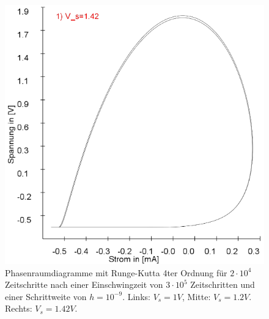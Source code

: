 \documentclass[11,5pt, twoside]{article}
\begin{document}
\begin{figure}[!htbp]
\includegraphics[scale=0.26]{schwing-runge-nach300k-weitere20k-10-9-1,42V}
\caption{Phasenraumdiagramme mit Runge-Kutta 4ter Ordnung für $2\cdot10^4$ Zeitschritte nach einer Einschwingzeit von  $3\cdot10^5$ Zeitschritten und einer Schrittweite von $h=10^{-9}$. Links: $V_s=1V$, Mitte: $V_s=1.2V$. Rechts: $V_s=1.42V$.}
\label{fig:ldr-0002}
\end{figure}
\end{document}
